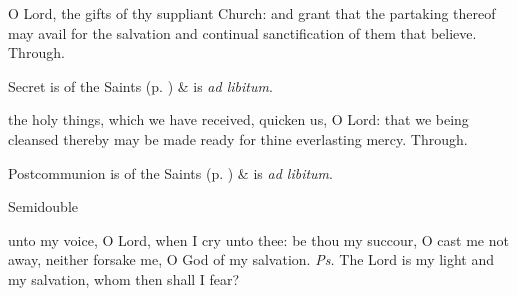 
\secret
{} O Lord, the gifts of thy suppliant Church: and grant that the partaking thereof may avail for the salvation and continual sanctification of them that believe. Through.
\begin{rubric}
     Secret is of the Saints (p. \pageref{SPSaints}) \&  is \emph{ad libitum}.
\end{rubric}



\postcommunion
{} the holy things, which we have received, quicken us, O Lord: that we being cleansed thereby may be made ready for thine everlasting mercy. Through.
\begin{rubric}
     Postcommunion is of the Saints (p. \pageref{SPSaints}) \&  is \emph{ad libitum}.
\end{rubric}

\begin{inhead}
    {Semidouble}
\end{inhead}
\par\noindent
{}





\properantiphonfix

\introit
{} unto my voice, O Lord, when I cry unto thee: be thou my succour, O cast me not away, neither forsake me, O God of my salvation. \textit{Ps.} The Lord is my light and my salvation, whom then shall I fear?

